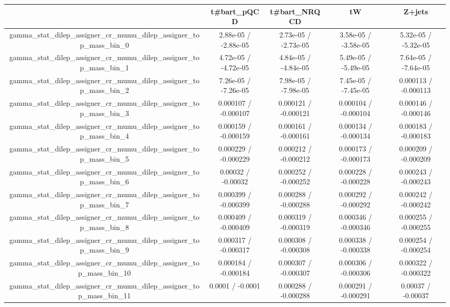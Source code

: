 \documentclass[10pt]{article}
\begin{document}
\begin{table}[htbp]
\begin{center}
\begin{tabular}{|c|c|c|c|c|}
\hline 
      & t#bar{t}_{pQCD}      & t#bar{t}_{NRQCD}      & tW      & Z+jets \\ 
\hline 
  gamma_stat_dilep_assigner_cr_mumu_dilep_assigner_top_mass_bin_0 & 2.88e-05 / -2.88e-05 & 2.73e-05 / -2.73e-05 & 3.58e-05 / -3.58e-05 & 5.32e-05 / -5.32e-05 \\ 
  gamma_stat_dilep_assigner_cr_mumu_dilep_assigner_top_mass_bin_1 & 4.72e-05 / -4.72e-05 & 4.84e-05 / -4.84e-05 & 5.49e-05 / -5.49e-05 & 7.64e-05 / -7.64e-05 \\ 
  gamma_stat_dilep_assigner_cr_mumu_dilep_assigner_top_mass_bin_2 & 7.26e-05 / -7.26e-05 & 7.98e-05 / -7.98e-05 & 7.45e-05 / -7.45e-05 & 0.000113 / -0.000113 \\ 
  gamma_stat_dilep_assigner_cr_mumu_dilep_assigner_top_mass_bin_3 & 0.000107 / -0.000107 & 0.000121 / -0.000121 & 0.000104 / -0.000104 & 0.000146 / -0.000146 \\ 
  gamma_stat_dilep_assigner_cr_mumu_dilep_assigner_top_mass_bin_4 & 0.000159 / -0.000159 & 0.000161 / -0.000161 & 0.000134 / -0.000134 & 0.000183 / -0.000183 \\ 
  gamma_stat_dilep_assigner_cr_mumu_dilep_assigner_top_mass_bin_5 & 0.000229 / -0.000229 & 0.000212 / -0.000212 & 0.000173 / -0.000173 & 0.000209 / -0.000209 \\ 
  gamma_stat_dilep_assigner_cr_mumu_dilep_assigner_top_mass_bin_6 & 0.00032 / -0.00032 & 0.000252 / -0.000252 & 0.000228 / -0.000228 & 0.000243 / -0.000243 \\ 
  gamma_stat_dilep_assigner_cr_mumu_dilep_assigner_top_mass_bin_7 & 0.000399 / -0.000399 & 0.000288 / -0.000288 & 0.000292 / -0.000292 & 0.000242 / -0.000242 \\ 
  gamma_stat_dilep_assigner_cr_mumu_dilep_assigner_top_mass_bin_8 & 0.000409 / -0.000409 & 0.000319 / -0.000319 & 0.000346 / -0.000346 & 0.000255 / -0.000255 \\ 
  gamma_stat_dilep_assigner_cr_mumu_dilep_assigner_top_mass_bin_9 & 0.000317 / -0.000317 & 0.000308 / -0.000308 & 0.000338 / -0.000338 & 0.000254 / -0.000254 \\ 
  gamma_stat_dilep_assigner_cr_mumu_dilep_assigner_top_mass_bin_10 & 0.000184 / -0.000184 & 0.000307 / -0.000307 & 0.000306 / -0.000306 & 0.000322 / -0.000322 \\ 
  gamma_stat_dilep_assigner_cr_mumu_dilep_assigner_top_mass_bin_11 & 0.0001 / -0.0001 & 0.000288 / -0.000288 & 0.000291 / -0.000291 & 0.00037 / -0.00037 \\ 

\end{tabular}
\end{center}
\end{table}
\end{document}
